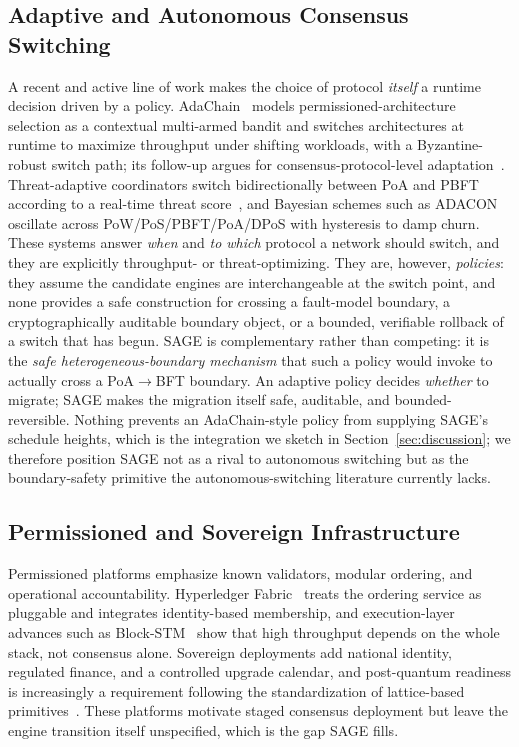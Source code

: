 \documentclass[journal]{IEEEtran}
\theoremstyle{remark}
\begin{document}
\subsection{Adaptive and Autonomous Consensus Switching}
A recent and active line of work makes the choice of protocol \emph{itself} a runtime decision driven
by a policy. AdaChain~\cite{adachain} models permissioned-architecture selection as a contextual
multi-armed bandit and switches architectures at runtime to maximize throughput under shifting
workloads, with a Byzantine-robust switch path; its follow-up argues for consensus-protocol-level
adaptation~\cite{adaptbft}. Threat-adaptive coordinators switch bidirectionally between PoA and
PBFT according to a real-time threat score~\cite{threatadapt}, and Bayesian schemes such as
ADACON~\cite{adacon} oscillate across PoW/PoS/PBFT/PoA/DPoS with hysteresis to damp churn. These
systems answer \emph{when} and \emph{to which} protocol a network should switch, and they are
explicitly throughput- or threat-optimizing. They are, however, \emph{policies}: they assume the
candidate engines are interchangeable at the switch point, and none provides a safe construction for
crossing a fault-model boundary, a cryptographically auditable boundary object, or a bounded,
verifiable rollback of a switch that has begun. SAGE is complementary rather than competing: it is the
\emph{safe heterogeneous-boundary mechanism} that such a policy would invoke to actually cross a
PoA$\rightarrow$BFT boundary. An adaptive policy decides \emph{whether} to migrate; SAGE makes the
migration itself safe, auditable, and bounded-reversible. Nothing prevents an AdaChain-style policy
from supplying SAGE's schedule heights, which is the integration we sketch in
Section~\ref{sec:discussion}; we therefore position SAGE not as a rival to autonomous switching but as
the boundary-safety primitive the autonomous-switching literature currently lacks.

\subsection{Permissioned and Sovereign Infrastructure}
Permissioned platforms emphasize known validators, modular ordering, and operational
accountability. Hyperledger Fabric~\cite{fabric} treats the ordering service as pluggable and
integrates identity-based membership, and execution-layer advances such as
Block-STM~\cite{blockstm} show that high throughput depends on the whole stack, not consensus
alone. Sovereign deployments add national identity, regulated finance, and a controlled
upgrade calendar, and post-quantum readiness is increasingly a requirement following the
standardization of lattice-based primitives~\cite{nistpqc}. These platforms motivate staged
consensus deployment but leave the engine transition itself unspecified, which is the gap
SAGE fills.
\end{document}
